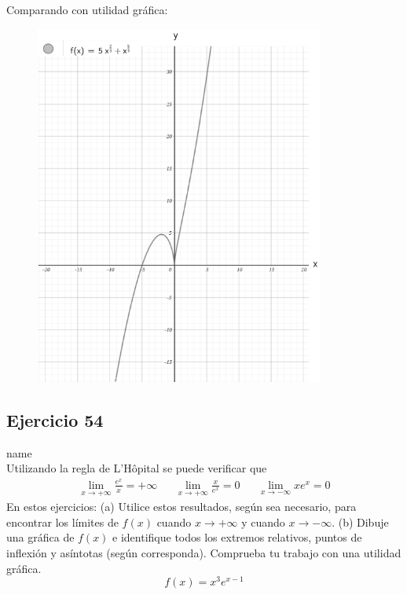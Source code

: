 \documentclass[12pt]{article}
\begin{document}
Comparando con utilidad gráfica:
\begin{figure}[H]
\centering
\includegraphics[width=0.85\textwidth]{../img/img_Lista3/p3_36.png}
\end{figure}



\subsection{Ejercicio 54} name \\

Utilizando la regla de L'Hôpital se puede verificar que
\begin{align*}
  \lim_{x \to +\infty} \frac{e^x}{x}=+\infty && \lim_{x \to +\infty} \frac{x}{e^x}=0 && \lim_{x \to -\infty} xe^x=0
\end{align*}
En estos ejercicios: (a) Utilice estos resultados, según sea necesario, para encontrar los límites de $f(x)$ cuando $x\rightarrow +\infty$ y cuando $x\rightarrow -\infty$. (b) Dibuje una gráfica de $f(x)$ e identifique todos los extremos relativos, puntos de inflexión y asíntotas (según corresponda). Comprueba tu trabajo con una utilidad gráfica.
\[
f(x)=x^3e^{x-1}
\]
\end{document}
